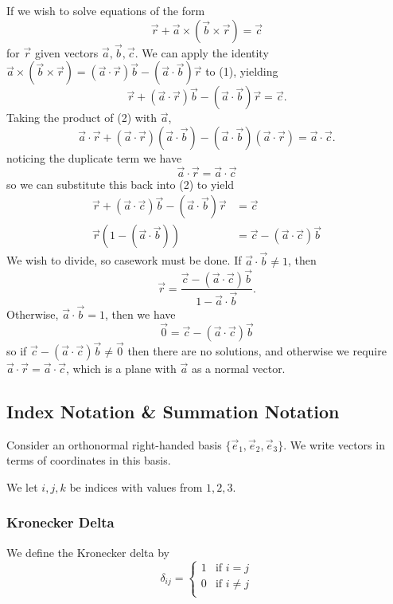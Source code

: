 \documentclass[12pt]{article}
\begin{document}
If we wish to solve equations of the form
\begin{equation}
\vec{r} + \vec{a} \times (\vec{b} \times \vec{r}) = \vec{c}
\end{equation}
for $\vec{r}$ given vectors $\vec{a},\vec{b},\vec{c}$.
We can apply the identity $\vec{a} \times (\vec{b} \times \vec{r}) 
= (\vec{a} \cdot \vec{r}) \vec{b} - (\vec{a} \cdot \vec{b})\vec{r}$ to (1), yielding
\begin{equation}
\vec{r} + (\vec{a} \cdot \vec{r}) \vec{b} - (\vec{a} \cdot \vec{b}) \vec{r} = \vec{c}.
\end{equation}
Taking the product of (2) with $\vec{a}$,
\[
\vec{a} \cdot \vec{r} + (\vec{a} \cdot \vec{r})(\vec{a} \cdot \vec{b}) 
- (\vec{a} \cdot \vec{b})(\vec{a} \cdot \vec{r}) = \vec{a} \cdot \vec{c}.
\]
noticing the duplicate term we have
\[
\vec{a}\cdot\vec{r} = \vec{a}\cdot\vec{c}
\]
so we can substitute this back into (2) to yield
\begin{align*}
    \vec{r} + (\vec{a}\cdot\vec{c})\vec{b} - (\vec{a}\cdot\vec{b})\vec{r} &= \vec{c}\\
    \vec{r}(1 - (\vec{a} \cdot \vec{b})) &= \vec{c} - (\vec{a} \cdot \vec{c})\vec{b}
\end{align*}
We wish to divide, so casework must be done. If $\vec{a} \cdot \vec{b} \ne 1$, then
\[
\vec{r} = \frac{\vec{c} - (\vec{a}\cdot\vec{c})\vec{b}}{1 - \vec{a}\cdot\vec{b}}.
\]
Otherwise, $\vec{a} \cdot \vec{b} = 1$, then we have
\[
    \vec{0} = \vec{c} - (\vec{a}\cdot\vec{c})\vec{b}
\]
so if $\vec{c} - (\vec{a}\cdot\vec{c})\vec{b} \ne \vec{0}$ then there are no solutions,
and otherwise we require $\vec{a}\cdot\vec{r} = \vec{a}\cdot\vec{c}$,
which is a plane with $\vec{a}$ as a normal vector.

\subsection{Index Notation \& Summation Notation}

Consider an orthonormal right-handed basis $\{\vec{e}_1,\vec{e}_2,\vec{e}_3\}$.
We write vectors in terms of coordinates in this basis.

We let $i,j,k$ be indices with values from $1,2,3$.

\subsubsection*{Kronecker Delta}

\begin{definition}
    We define the Kronecker delta by
    \[
        \delta_{ij} = \begin{cases}
            1 & \text{if } i = j\\
            0 & \text{if } i \ne j\\
        \end{cases}
    \]
\end{definition}
\end{document}
